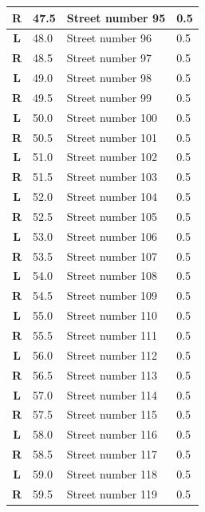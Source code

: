 \documentclass[11pt]{article}
\begin{document}
\begin{center}
\begin{supertabular}{|c|p{0.30in}|p{2.25in}|l|}
 \textbf{R} &  47.5 & Street number 95 &   0.5 \\ \hline
 \textbf{L} &  48.0 & Street number 96 &   0.5 \\ \hline
{} \textbf{R} &  48.5 & Street number 97 &   0.5 \\ \hline
 \textbf{L} &  49.0 & Street number 98 &   0.5 \\ \hline
{} \textbf{R} &  49.5 & Street number 99 &   0.5 \\ \hline
 \textbf{L} &  50.0 & Street number 100 &   0.5 \\ \hline
{} \textbf{R} &  50.5 & Street number 101 &   0.5 \\ \hline
 \textbf{L} &  51.0 & Street number 102 &   0.5 \\ \hline
{} \textbf{R} &  51.5 & Street number 103 &   0.5 \\ \hline
 \textbf{L} &  52.0 & Street number 104 &   0.5 \\ \hline
{} \textbf{R} &  52.5 & Street number 105 &   0.5 \\ \hline
 \textbf{L} &  53.0 & Street number 106 &   0.5 \\ \hline
{} \textbf{R} &  53.5 & Street number 107 &   0.5 \\ \hline
 \textbf{L} &  54.0 & Street number 108 &   0.5 \\ \hline
{} \textbf{R} &  54.5 & Street number 109 &   0.5 \\ \hline
 \textbf{L} &  55.0 & Street number 110 &   0.5 \\ \hline
{} \textbf{R} &  55.5 & Street number 111 &   0.5 \\ \hline
 \textbf{L} &  56.0 & Street number 112 &   0.5 \\ \hline
{} \textbf{R} &  56.5 & Street number 113 &   0.5 \\ \hline
 \textbf{L} &  57.0 & Street number 114 &   0.5 \\ \hline
{} \textbf{R} &  57.5 & Street number 115 &   0.5 \\ \hline
 \textbf{L} &  58.0 & Street number 116 &   0.5 \\ \hline
{} \textbf{R} &  58.5 & Street number 117 &   0.5 \\ \hline
 \textbf{L} &  59.0 & Street number 118 &   0.5 \\ \hline
{} \textbf{R} &  59.5 & Street number 119 &   0.5 \\ \hline

\end{supertabular}
\end{center}
\end{document}
